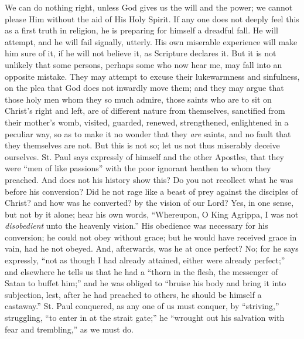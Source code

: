 We can do nothing right, unless God gives us the will and the
power; we cannot please Him without the aid of His Holy Spirit. If any
one does not deeply feel this as a first truth in religion, he is
preparing for himself a dreadful fall. He will attempt, and he will
fail signally, utterly. His own miserable experience will make him
sure of it, if he will not believe it, as Scripture declares it. But
it is not unlikely that some persons, perhaps some who now hear me,
may fall into an opposite mistake. They may attempt to excuse their
lukewarmness and sinfulness, on the plea that God does not inwardly
move them; and they may argue that those holy men whom they so much
admire, those saints who are to sit on Christ's right and left, are of
different nature from themselves, sanctified from their mother's womb,
visited, guarded, renewed, strengthened, enlightened in a peculiar
way, so as to make it no wonder that they \emph{are} saints, and no fault
that they themselves are not. But this is not so; let us not thus
miserably deceive ourselves. St. Paul says expressly of himself and
the other Apostles, that they were ``men of like passions''
with the poor ignorant heathen to whom they preached. And does not his
history show this? Do you not recollect what he was before his
conversion? Did he not rage like a beast of prey against the disciples
of Christ? and how was he converted? by the vision of our Lord? Yes,
in one sense, but not by it alone; hear his own words,
``Whereupon, O King Agrippa, I was not \emph{disobedient} unto the
heavenly vision.'' His obedience was necessary for his conversion;
he could not obey without grace; but he would have received grace in
vain, had he not obeyed. And, afterwards, was he at once perfect? No;
for he says expressly, ``not as though I had already attained,
either were already perfect;'' and elsewhere he tells us that he
had a ``thorn in the flesh, the messenger of Satan to buffet him;'' and he was obliged to ``bruise his body and bring it into
subjection, lest, after he had preached to others, he should be
himself a castaway.'' St. Paul conquered, as any one of us must
conquer, by ``striving,'' struggling, ``to enter in at the
strait gate;'' he ``wrought out his salvation with fear and
trembling,'' as we must do.

